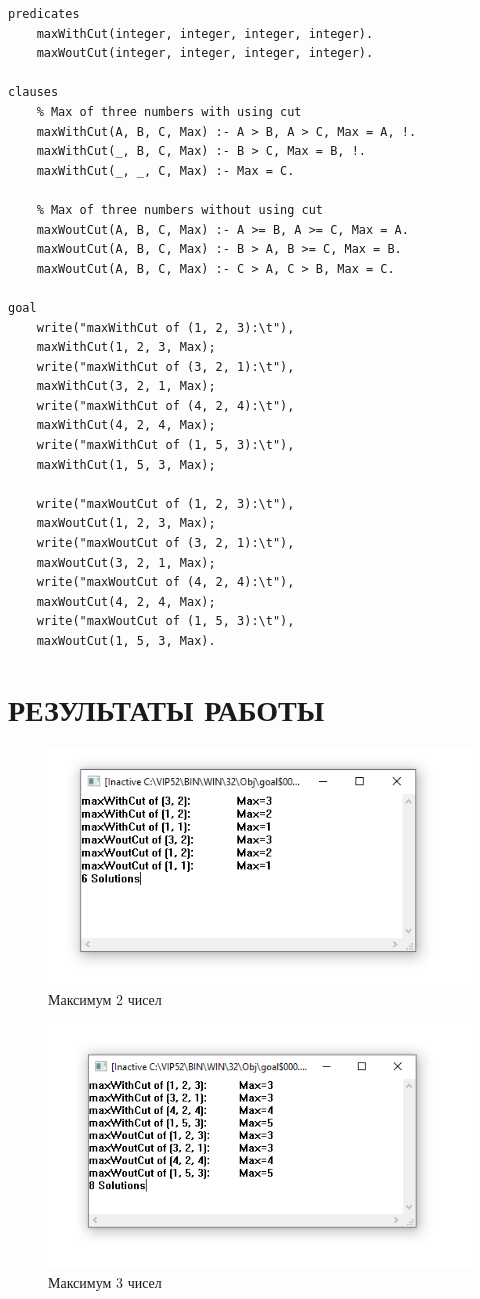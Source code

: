 \begin{lstlisting}[caption=Максимум 3 чисел]
predicates
	maxWithCut(integer, integer, integer, integer).
	maxWoutCut(integer, integer, integer, integer).

clauses
	% Max of three numbers with using cut
	maxWithCut(A, B, C, Max) :- A > B, A > C, Max = A, !.
	maxWithCut(_, B, C, Max) :- B > C, Max = B, !.
	maxWithCut(_, _, C, Max) :- Max = C.

	% Max of three numbers without using cut
	maxWoutCut(A, B, C, Max) :- A >= B, A >= C, Max = A.
	maxWoutCut(A, B, C, Max) :- B > A, B >= C, Max = B.
	maxWoutCut(A, B, C, Max) :- C > A, C > B, Max = C.

goal
	write("maxWithCut of (1, 2, 3):\t"),
	maxWithCut(1, 2, 3, Max);
	write("maxWithCut of (3, 2, 1):\t"),
	maxWithCut(3, 2, 1, Max);
	write("maxWithCut of (4, 2, 4):\t"),
	maxWithCut(4, 2, 4, Max);
	write("maxWithCut of (1, 5, 3):\t"),
	maxWithCut(1, 5, 3, Max);
	
	write("maxWoutCut of (1, 2, 3):\t"),
	maxWoutCut(1, 2, 3, Max);
	write("maxWoutCut of (3, 2, 1):\t"),
	maxWoutCut(3, 2, 1, Max);
	write("maxWoutCut of (4, 2, 4):\t"),
	maxWoutCut(4, 2, 4, Max);
	write("maxWoutCut of (1, 5, 3):\t"),
	maxWoutCut(1, 5, 3, Max).
\end{lstlisting}

\section{РЕЗУЛЬТАТЫ РАБОТЫ}

\begin{figure}[H]
    \centering
    \includegraphics[scale=0.8]{img/max2.png}
    \caption{Максимум 2 чисел}
\end{figure}

\begin{figure}[H]
    \centering
    \includegraphics[scale=0.8]{img/max3.png}
    \caption{Максимум 3 чисел}
\end{figure}
